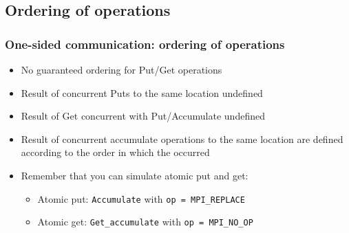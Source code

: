 \documentclass{beamer}
\begin{document}
\subsection{Ordering of operations}
\begin{frame}[fragile]
  \frametitle{One-sided communication: ordering of operations }
\begin{itemize}
\item  No guaranteed ordering for Put/Get operations
\item Result of concurrent Puts to the same location
undefined
\item Result of Get concurrent with Put/Accumulate undefined
\item Result of concurrent accumulate operations to the
same location are defined according to the order in
which the occurred
\item Remember that you can simulate atomic put and get:
\begin{itemize}
\item Atomic put: {\color{mycolorcode}\verb|Accumulate|} with {\color{mycolorcode}\verb|op = MPI_REPLACE|}
\item Atomic get: {\color{mycolorcode}\verb|Get_accumulate|} with {\color{mycolorcode}\verb|op = MPI_NO_OP|}
\end{itemize}
\end{itemize}
\end{frame}
\end{document}
